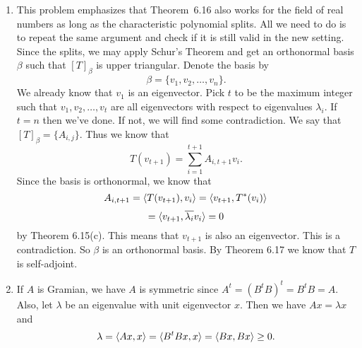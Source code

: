 \begin{enumerate}
\item This problem emphasizes that Theorem~6.16 also works for the field of real numbers as long as the characteristic polynomial splits.  All we need to do is to repeat the same argument and check if it is still valid in the new setting.  Since the \charpoly{} splits, we may apply Schur's Theorem and get an orthonormal basis $\beta $ such that $[T]_{\beta}$ is upper triangular. Denote the basis by 
\[\beta =\{v_1,v_2,\ldots ,v_n\}.\]
We already know that $v_1$ is an eigenvector. Pick $t$ to be the maximum integer such that $v_1,v_2,\ldots ,v_t$ are all eigenvectors with respect to eigenvalues $\lambda _i$. If $t=n$ then we've done. If not, we will find some contradiction. We say that $[T]_{\beta}=\{A_{i,j}\}$. Thus we know that 
\[T(v_{t+1})=\sum_{i=1}^{t+1}{A_{i,t+1}v_i}.\]
Since the basis is orthonormal, we know that 
\[A_{i,t+1}=\langle T(v_{t+1}),v_i\rangle =\langle v_{t+1},T^*(v_i)\rangle \]
\[=\langle v_{t+1},\overline{\lambda_i}v_i\rangle =0\]
by Theorem 6.15(c). This means that $v_{t+1}$ is also an eigenvector. This is a contradiction. So $\beta $ is an orthonormal basis. By Theorem 6.17 we know that $T$ is self-adjoint.
\item If $A$ is Gramian, we have $A$ is symmetric since $A^t=(B^tB)^t=B^tB=A$. Also, let $\lambda $ be an eigenvalue with unit eigenvector $x$. Then we have $Ax=\lambda x$ and 
\[\lambda =\langle Ax,x\rangle =\langle B^tBx,x\rangle =\langle Bx,Bx\rangle \geq 0.\]


\end{enumerate}
